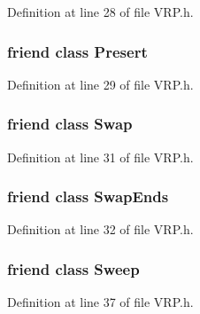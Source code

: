Definition at line 28 of file VRP.h.

\hypertarget{class_v_r_p_ab909d662038d19e5f8fe92828f2876c0}{
\subsubsection[{Presert}]{\setlength{\rightskip}{0pt plus 5cm}friend class {\bf Presert}}}
\label{class_v_r_p_ab909d662038d19e5f8fe92828f2876c0}


Definition at line 29 of file VRP.h.

\hypertarget{class_v_r_p_a70514fe066409f0e910cf8622c6ec2fd}{
\subsubsection[{Swap}]{\setlength{\rightskip}{0pt plus 5cm}friend class {\bf Swap}}}
\label{class_v_r_p_a70514fe066409f0e910cf8622c6ec2fd}


Definition at line 31 of file VRP.h.

\hypertarget{class_v_r_p_a8dcd8df53052c8616440b02c62028d2b}{
\subsubsection[{SwapEnds}]{\setlength{\rightskip}{0pt plus 5cm}friend class {\bf SwapEnds}}}
\label{class_v_r_p_a8dcd8df53052c8616440b02c62028d2b}


Definition at line 32 of file VRP.h.

\hypertarget{class_v_r_p_a908f328c298fc585c89c0ab14546aeba}{
\subsubsection[{Sweep}]{\setlength{\rightskip}{0pt plus 5cm}friend class {\bf Sweep}}}
\label{class_v_r_p_a908f328c298fc585c89c0ab14546aeba}


Definition at line 37 of file VRP.h.

